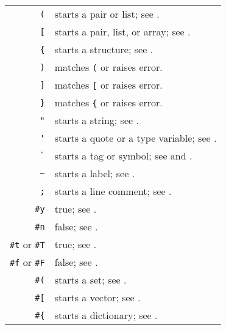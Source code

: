 \begin{table}
\begin{longtable}{ r l }
  \lstinline!(! & starts a pair or list; see \nameref{subsec:aml-base-lang-reader-lists}. \\
  \lstinline![! & starts a pair, list, or array; see \nameref{subsec:aml-base-lang-reader-lists}. \\
  \lstinline!{! & starts a structure; see \nameref{subsec:aml-base-lang-reader-structures}. \\
  \lstinline!)! & matches \lstinline!(! or raises error. \\
  \lstinline!]! & matches \lstinline![! or raises error. \\
  \lstinline!}! & matches \lstinline!{! or raises error. \\
  
\pagebreak[2]
  \lstinline!"! & starts a string; see \nameref{subsec:aml-base-lang-reader-strings}. \\
  \lstinline!'! & starts a quote or a type variable; see \nameref{subsec:aml-base-lang-reader-quotes}. \\
  \lstinline!`! & starts a tag or symbol; see \nameref{subsec:aml-base-lang-reader-polytags} and \nameref{subsec:aml-base-lang-reader-symbols}. \\
  \lstinline!~! & starts a label; see \nameref{subsec:aml-base-lang-reader-labels}. \\
  \lstinline!;! & starts a line comment; see \nameref{subsec:aml-base-lang-reader-comments}. \\
  
\pagebreak[2]
  \lstinline!#y! & true; see \nameref{subsec:aml-base-lang-reader-booleans}. \\
  \lstinline!#n! & false; see \nameref{subsec:aml-base-lang-reader-booleans}. \\
  \lstinline!#t! or \lstinline!#T! & true; see \nameref{subsec:aml-base-lang-reader-booleans}. \\
  \lstinline!#f! or \lstinline!#F! & false; see \nameref{subsec:aml-base-lang-reader-booleans}. \\  
  
  \lstinline!#(! & starts a set; see \nameref{subsec:aml-base-lang-reader-sets}. \\
  \lstinline!#[! & starts a vector; see \nameref{subsec:aml-base-lang-reader-vectors}. \\
  \lstinline!#{! & starts a dictionary; see \nameref{subsec:aml-base-lang-reader-dictionaries}. \\
  

\end{longtable}
\end{table}

